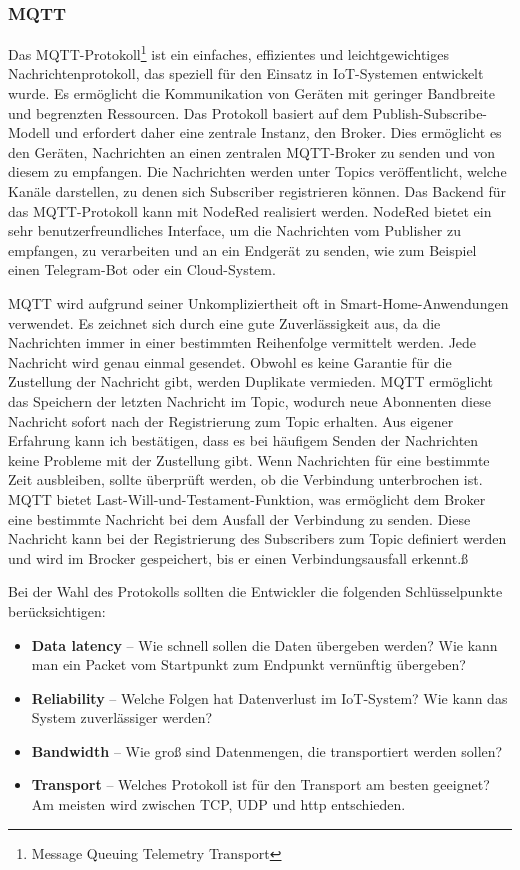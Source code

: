 \documentclass[12pt, a4paper]{article}
\begin{document}
\subsubsection{MQTT}
\par Das MQTT-Protokoll\footnote[1]{Message Queuing Telemetry Transport} ist ein einfaches, effizientes und leichtgewichtiges Nachrichtenprotokoll, das speziell für den Einsatz in IoT-Systemen entwickelt wurde. Es ermöglicht die Kommunikation von Geräten mit geringer Bandbreite und begrenzten Ressourcen. Das Protokoll basiert auf dem Publish-Subscribe-Modell und erfordert daher eine zentrale Instanz, den Broker. Dies ermöglicht es den Geräten, Nachrichten an einen zentralen MQTT-Broker zu senden und von diesem zu empfangen. Die Nachrichten werden unter Topics veröffentlicht, welche Kanäle darstellen, zu denen sich Subscriber registrieren können. Das Backend für das MQTT-Protokoll kann mit NodeRed realisiert werden. NodeRed bietet ein sehr benutzerfreundliches Interface, um die Nachrichten vom Publisher zu empfangen, zu verarbeiten und an ein Endgerät zu senden, wie zum Beispiel einen Telegram-Bot oder ein Cloud-System.
\par MQTT wird aufgrund seiner Unkompliziertheit oft in Smart-Home-Anwendungen verwendet. Es zeichnet sich durch eine gute Zuverlässigkeit aus, da die Nachrichten immer in einer bestimmten Reihenfolge vermittelt werden. Jede Nachricht wird genau einmal gesendet. Obwohl es keine Garantie für die Zustellung der Nachricht gibt, werden Duplikate vermieden. MQTT ermöglicht das Speichern der letzten Nachricht im Topic, wodurch neue Abonnenten diese Nachricht sofort nach der Registrierung zum Topic erhalten. Aus eigener Erfahrung kann ich bestätigen, dass es bei häufigem Senden der Nachrichten keine Probleme mit der Zustellung gibt. Wenn Nachrichten für eine bestimmte Zeit ausbleiben, sollte überprüft werden, ob die Verbindung unterbrochen ist. MQTT bietet Last-Will-und-Testament-Funktion, was ermöglicht dem Broker eine bestimmte Nachricht bei dem Ausfall der Verbindung zu senden. Diese Nachricht kann bei der Registrierung des Subscribers zum Topic definiert werden und wird im Brocker gespeichert, bis er einen Verbindungsausfall erkennt.ß
\par Bei der Wahl des Protokolls sollten die Entwickler die folgenden Schlüsselpunkte berücksichtigen:
\begin{itemize}
  \item[\textbullet] \textbf{Data latency} – Wie schnell sollen die Daten übergeben werden? Wie kann man ein Packet vom Startpunkt zum Endpunkt vernünftig übergeben?
  \item[\textbullet] \textbf{Reliability} – Welche Folgen hat Datenverlust im IoT-System? Wie kann das System zuverlässiger werden?
  \item[\textbullet] \textbf{Bandwidth} – Wie groß sind Datenmengen, die transportiert werden sollen?
  \item[\textbullet] \textbf{Transport} – Welches Protokoll ist für den Transport am besten geeignet? Am meisten wird zwischen TCP, UDP und http entschieden.
\end{itemize}
\end{document}
